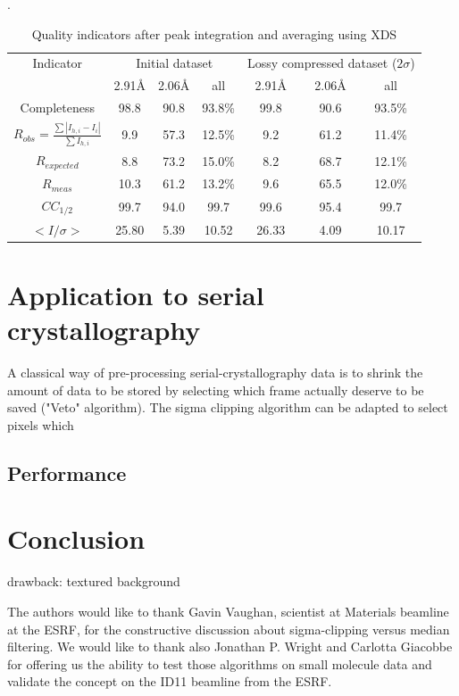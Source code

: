 \documentclass[preprint]{iucr}              %
\begin{document}
\begin{table}[1]
\begin{center}
\label{xds_summary}
\caption{Quality indicators after peak integration and averaging using XDS\cite{xds}}.
\begin{tabular}{|c|c c c|c c c|} 
\hline
Indicator & \multicolumn{3}{c|}{Initial dataset}} & \multicolumn{3}{c|}{Lossy compressed dataset ($2\sigma$)} \\ 
          & 2.91\AA & 2.06\AA & all & 2.91\AA & 2.06\AA & all \\
\hline
Completeness                                        & 98.8& 90.8 & 93.8\% & 99.8& 90.6 & 93.5\% \\ 
$R_{obs}=\frac{\sum |I_{h,i}-I_{i}|}{\sum I_{h,i}}$ & 9.9 & 57.3& 12.5\% & 9.2 & 61.2&  11.4\%\\ 
$R_{expected}$                                      & 8.8 & 73.2& 15.0\% & 8.2 & 68.7 &  12.1\%\\
$R_{meas}$ \cite{Rmeas}  &10.3 &61.2& 13.2\% & 9.6 & 65.5 & 12.0\%\\
$CC_{1/2}$ \cite{cc1/2}  & 99.7 &94.0 & 99.7   & 99.6 & 95.4 & 99.7  \\
$<I/\sigma>$               & 25.80 & 5.39 & 10.52  & 26.33& 4.09 & 10.17 \\
\hline
\end{tabular}
\end{center}
\end{table}


\section{Application to serial crystallography}
A classical way of pre-processing serial-crystallography data is to shrink the amount of data to be stored by selecting which frame actually deserve to be saved ("Veto" algorithm).
The sigma clipping algorithm can be adapted to select pixels which   
\subsection{Performance}
\section{Conclusion}
drawback: textured background



The authors would like to thank Gavin Vaughan, scientist at Materials beamline at the ESRF,  for the constructive discussion about sigma-clipping versus median filtering. 
We would like to thank also Jonathan P. Wright and Carlotta Giacobbe for offering us the ability to test those algorithms on small molecule data and validate the concept on the ID11 beamline from the ESRF.




\end{document}
